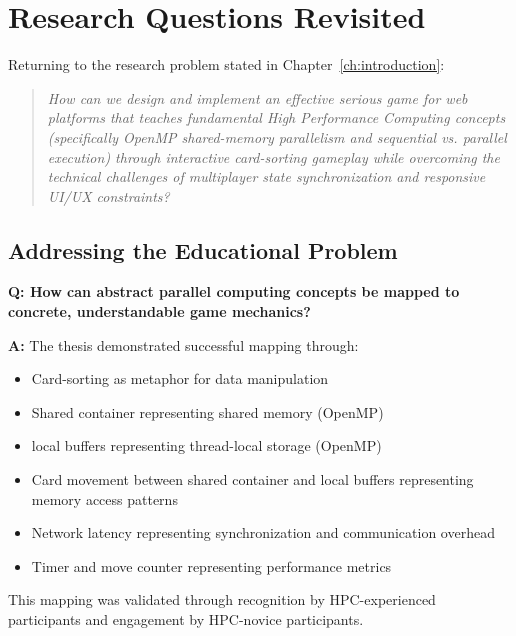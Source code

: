 \section{Research Questions Revisited}
\label{sec:research-questions}

Returning to the research problem stated in Chapter~\ref{ch:introduction}:

\begin{quote}
    \textit{How can we design and implement an effective serious game for web platforms that teaches fundamental High Performance Computing concepts (specifically OpenMP shared-memory parallelism and sequential vs. parallel execution) through interactive card-sorting gameplay while overcoming the technical challenges of multiplayer state synchronization and responsive UI/UX constraints?}
\end{quote}

\subsection{Addressing the Educational Problem}
\label{subsec:educational-problem-answered}

\textbf{Q: How can abstract parallel computing concepts be mapped to concrete, understandable game mechanics?}

\textbf{A:} The thesis demonstrated successful mapping through:
\begin{itemize}
    \item Card-sorting as metaphor for data manipulation
    \item Shared container representing shared memory (OpenMP)
    \item local buffers representing thread-local storage (OpenMP)
    \item Card movement between shared container and local buffers representing memory access patterns
    \item Network latency representing synchronization and communication overhead
    \item Timer and move counter representing performance metrics
\end{itemize}

This mapping was validated through recognition by HPC-experienced participants and engagement by HPC-novice participants.

